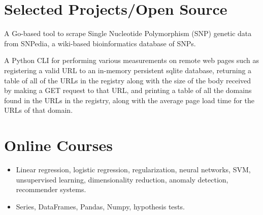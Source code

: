 \documentclass[11pt,a4paper,sans]{moderncv}
\begin{document}

\section{\textbf{Selected Projects/Open Source}}

  {A Go-based tool to scrape Single Nucleotide Polymorphism (SNP) genetic data from SNPedia, a wiki-based bioinformatics database of SNPs.}

  {A Python CLI for performing various measurements on remote web pages such as registering a valid URL to an in-memory persistent sqlite database, returning a table of all of the URLs in the registry along with the size of the body received by making a GET request to that URL, and printing a table of all the domains found in the URLs in the registry, along with the average page load time for the URLs of that domain.}

\section{\textbf{Online Courses}}
{ \begin{itemize} \itemsep -1pt
   \item Linear regression, logistic regression, regularization, neural networks, SVM, unsupervised learning, dimensionality reduction, anomaly detection, recommender systems. 
\end{itemize}}

   { \begin{itemize} \itemsep -1pt
	\item Series, DataFrames, Pandas, Numpy, hypothesis tests.
\end{itemize} }
\end{document}
